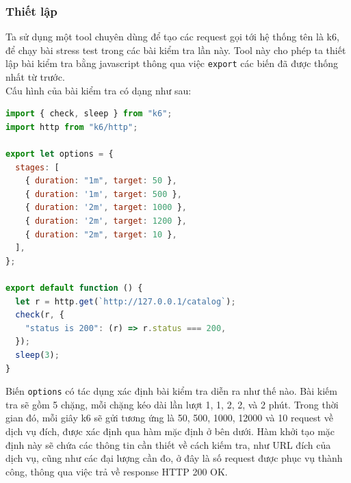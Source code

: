 \subsubsection{Thiết lập}
\noindent Ta sử dụng một tool chuyên dùng để tạo các request gọi tới hệ thống tên là k6, để chạy bài stress test trong các bài kiểm tra lần này. Tool này cho phép ta thiết lập bài kiểm tra bằng javascript thông qua việc \lstinline|export| các biến đã được thống nhất từ trước.\\[0.5cm]
Cấu hình của bài kiểm tra có dạng như sau:
\begin{lstlisting}[language=javascript]
import { check, sleep } from "k6";
import http from "k6/http";

export let options = {
  stages: [
    { duration: "1m", target: 50 },
    { duration: '1m', target: 500 },
    { duration: '2m', target: 1000 },
    { duration: '2m', target: 1200 },
    { duration: "2m", target: 10 },
  ],
};

export default function () {
  let r = http.get(`http://127.0.0.1/catalog`);
  check(r, {
    "status is 200": (r) => r.status === 200,
  });
  sleep(3);
}
\end{lstlisting}
Biến \lstinline|options| có tác dụng xác định bài kiểm tra diễn ra như thế nào. Bài kiếm tra sẽ gồm 5 chặng, mỗi chặng kéo dài lần lượt 1, 1, 2, 2, và 2 phút. Trong thời gian đó, mỗi giây k6 sẽ gửi tương ứng là 50, 500, 1000, 12000 và 10 request về dịch vụ đích, được xác định qua hàm mặc định ở bên dưới. Hàm khởi tạo mặc định này sẽ chứa các thông tin cần thiết về cách kiếm tra, như URL đích của dịch vụ, cũng như các đại lượng cần đo, ở đây là số request được phục vụ thành công, thông qua việc trả về response HTTP 200 OK.
